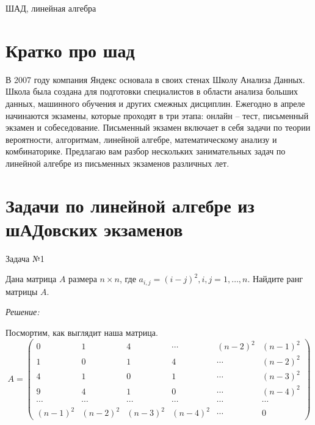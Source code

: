\documentclass[10pt]{article}
\begin{document}


\DoFirstPageTechnicalStuff

\begin{abstract}
\end{abstract}

\begin{keyword}
ШАД, линейная алгебра
\end{keyword}

\section{Кратко про шад}

В 2007 году компания Яндекс основала в своих стенах Школу Анализа Данных. Школа была создана для подготовки специалистов в области анализа больших данных, машинного обучения и других смежных дисциплин. Ежегодно в апреле начинаются экзамены, которые проходят в три этапа: онлайн -- тест, письменный экзамен и собеседование. Письменный экзамен включает в себя задачи по теории вероятности, алгоритмам, линейной алгебре, математическому анализу и комбинаторике. Предлагаю вам разбор нескольких занимательных задач по линейной алгебре из письменных экзаменов различных лет.

\section{Задачи по линейной алгебре из шАДовских экзаменов}

Задача №1

Дана матрица $A$ размера $n \times n$, где $a_{i,j} = (i-j)^2, i,j = 1,\ldots ,n$. Найдите ранг матрицы $A$.

\textit{Решение:}

Посмортим, как выглядит наша матрица.
\[
A = \begin{pmatrix}
0 & 1 & 4 & \cdots & (n-2)^2 & (n-1)^2 \\
1 & 0 & 1 & 4 & \cdots & (n-2)^2 \\
4 & 1 & 0 & 1 & \cdots & (n-3)^2 \\
9 & 4 & 1 & 0 & \cdots & (n-4)^2 \\
\cdots & \cdots & \cdots & \cdots & \cdots & \cdots \\
(n-1)^2 & (n-2)^2 & (n-3)^2 & (n-4)^2 & \cdots & 0
\end{pmatrix}
\]
\end{document}
